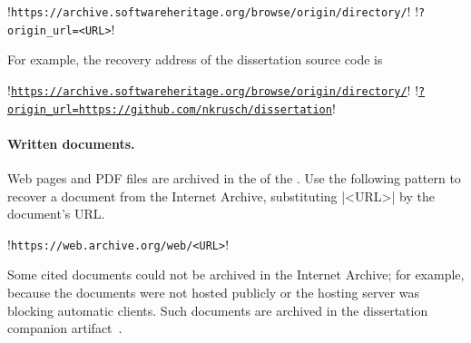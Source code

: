 \begin{center}
\begin{minipage}{\textwidth}
\begin{browserlisting}
!\texttt{https://archive.softwareheritage.org/browse/origin/directory/}!
!\hspace{2em}\texttt{?origin\_url=<URL>}!
\end{browserlisting}
\end{minipage}
\end{center}

For example, the recovery address of the dissertation source code is

\begin{center}
\begin{minipage}{\textwidth}
\begin{browserlisting}
!\texttt{\href{https://archive.softwareheritage.org/browse/origin/directory/?origin_url=https://github.com/nkrusch/dissertation}{https://archive.softwareheritage.org/browse/origin/directory/}}!
!\hspace{2em}\texttt{\href{https://archive.softwareheritage.org/browse/origin/directory/?origin_url=https://github.com/nkrusch/dissertation}{?origin\_url=https://github.com/nkrusch/dissertation}}!
\end{browserlisting}
\end{minipage}
\end{center}

\paragraph*{Written documents.}
Web pages and PDF files are archived in the  of the
. Use the following pattern to recover a document from the
Internet Archive, substituting \pr|<URL>| by the document's URL\@.

\begin{center}
\begin{minipage}{\textwidth}
\begin{browserlisting}
!\texttt{https://web.archive.org/web/<URL>}!
\end{browserlisting}
\end{minipage}
\end{center}

Some cited documents could not be archived in the Internet Archive; for example,
because the documents were not hosted publicly or the hosting server was
blocking automatic clients. Such documents are archived in the dissertation
companion artifact~\cite{aicc}.

